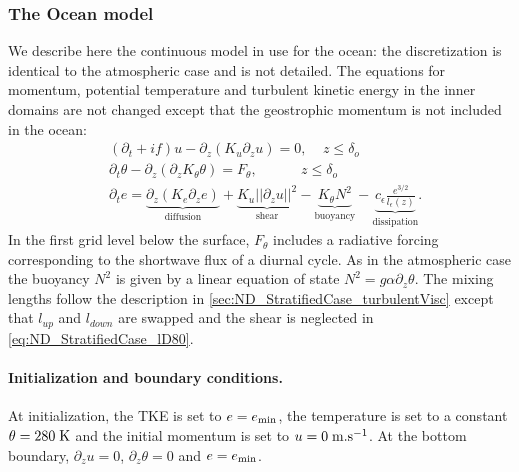 \subsubsection{The Ocean model}
We describe here the continuous model in use for the ocean:
the discretization is identical to the atmospheric case
and is not detailed.
The equations for momentum, potential temperature and
turbulent kinetic energy in the inner domains are not changed
except that the geostrophic momentum is not included in the ocean:
\begin{equation}
	\begin{aligned}
	&(\partial_t + if) u - \partial_z (K_u \partial_z u) = 0
		,~~~~~ z \leq \delta_{o} \\
	&\partial_t \theta -\partial_z (\partial_z K_{\theta} \theta)
	= F_{\theta},~~~~~~~~~~~~~~ z \leq \delta_{o} \\
		&\partial_t e =
    \underbrace{\partial_z \left(K_e
    \partial_z e\right)}_{\text{diffusion}}
    + \underbrace{K_u ||\partial_z u||^2}_{\text{shear}} 
    - \underbrace{K_{\theta} N^2 }_{\text{buoyancy}}
    - \underbrace{c_{\epsilon}
    \frac{e^{3/2}}{l_{\epsilon}(z)}}_{\text{dissipation}}.
	\end{aligned}
\end{equation}
In the first grid level below the surface, $F_\theta$ includes a
radiative forcing corresponding to the shortwave flux of a
diurnal cycle. As in the atmospheric case the buoyancy $N^2$ is
given by a linear equation of state
$N^2 = g \alpha \partial_z \theta$.
The mixing lengths follow the description in 
\ref{sec:ND_StratifiedCase_turbulentVisc}
except that $l_{up}$ and $l_{down}$ are swapped and the shear
is neglected in \eqref{eq:ND_StratifiedCase_lD80}.
%
\paragraph{Initialization and boundary conditions.}
At initialization, the TKE is set to $e=e_{\rm min}$, 
the temperature is set to a constant $\theta = 280 \; {\rm K}$
and the initial momentum is set to $u = 0 \; {\rm m}.{\rm s}^{-1}$.
At the bottom boundary,
$\partial_z u = 0$,
$\partial_z \theta = 0$ and $e=e_{\rm min}$.

